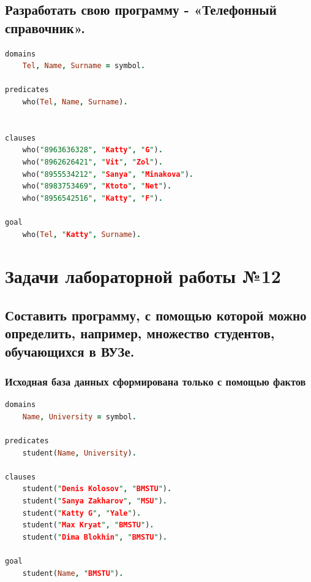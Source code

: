 \documentclass[12pt,a4paper]{article}
\begin{document}
\subsection{Разработать свою программу - «Телефонный справочник».}

\begin{lstlisting}[language=Prolog]
domains
	Tel, Name, Surname = symbol.

predicates
	who(Tel, Name, Surname).

	
clauses
	who("8963636328", "Katty", "G").
	who("8962626421", "Vit", "Zol").
	who("8955534212", "Sanya", "Minakova").
	who("8983753469", "Ktoto", "Net").
	who("8956542516", "Katty", "F").
	
goal
	who(Tel, "Katty", Surname).
\end{lstlisting}

\section{Задачи лабораторной работы №12}
\subsection{Составить программу, с помощью которой можно определить, например, множество студентов, обучающихся в ВУЗе.}

\subsubsection{Исходная база данных сформирована только с помощью фактов}
\begin{lstlisting}[language=Prolog]
domains
	Name, University = symbol.
	
predicates
	student(Name, University).
	
clauses
	student("Denis Kolosov", "BMSTU").
	student("Sanya Zakharov", "MSU").
	student("Katty G", "Yale").
	student("Max Kryat", "BMSTU").
	student("Dima Blokhin", "BMSTU").
	
goal
	student(Name, "BMSTU").
\end{lstlisting}
\clearpage
\end{document}

